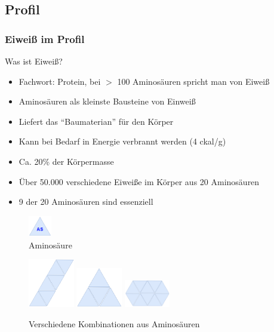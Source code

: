 \documentclass[xcolor=dvipsnames]{beamer}
\begin{document}
    \subsection{Profil}
    \begin{frame}[allowframebreaks]
        \frametitle{Eiweiß im Profil}

        \begin{block}{Was ist Eiweiß?}
            \begin{itemize}
                \setlength\itemsep{1em}
                \item Fachwort: Protein, bei $>$ 100 Aminosäuren spricht man von Eiweiß
                \item Aminosäuren als kleinste Bausteine von Einweiß
                \item Liefert das "`Baumaterian"' für den Körper
                \item Kann bei Bedarf in Energie verbrannt werden (4 ckal/g)
                \item Ca. 20\% der Körpermasse
                \item Über 50.000 verschiedene Eiweiße im Körper aus 20 Aminosäuren
                \item 9 der 20 Aminosäuren sind essenziell
            \end{itemize}
        \end{block}

        \framebreak

        \begin{figure}
            \centering
            \includegraphics[width=1cm]{../images/as.png}
            \caption{Aminosäure}
        \end{figure}

        \begin{figure}
            \centering
            \includegraphics[width=2cm]{../images/as1.png}
            \includegraphics[width=2cm]{../images/as2.png}
            \includegraphics[width=2cm]{../images/as3.png}
            \caption{Verschiedene Kombinationen aus Aminosäuren}
        \end{figure}
    \end{frame}
\end{document}
